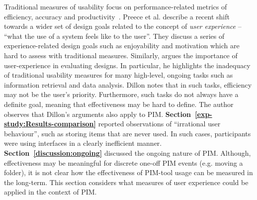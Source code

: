 

Traditional measures of usability focus on performance-related metrics of efficiency, accuracy and productivity~\citep{ad:01,preece:02}.  Preece et al. describe a recent shift towards a wider set of design goals related to the concept of \textit{user experience} -- ``what the use of a system feels like to the user''.  They discuss a series of experience-related design goals such as enjoyability and motivation which are hard to assess with traditional measures.  Similarly, \citet{ad:01} argues the importance of user-experience in evaluating designs.  In particular, he highlights the inadequacy of traditional usability measures for many high-level, ongoing tasks such as information retrieval and data analysis.  Dillon notes that in such tasks, efficiency may not be the user's priority.  Furthermore, such tasks do not always have a definite goal, meaning that effectiveness may be hard to define.
The author observes that Dillon's arguments also apply to PIM.  \textbf{Section~\ref{exp-study:Results-comparison}} reported observations of ``irrational user behaviour'', such as storing items that are never used.  In such cases, participants were using interfaces in a clearly inefficient manner.  \textbf{Section~\ref{discussion:ongoing}} discussed the ongoing nature of PIM.  Although, effectiveness may be meaningful for discrete one-off PIM events (e.g. moving a folder), it is not clear how the effectiveness of PIM-tool usage can be measured in the long-term.
This section considers what measures of user experience could be applied in the context of PIM.

